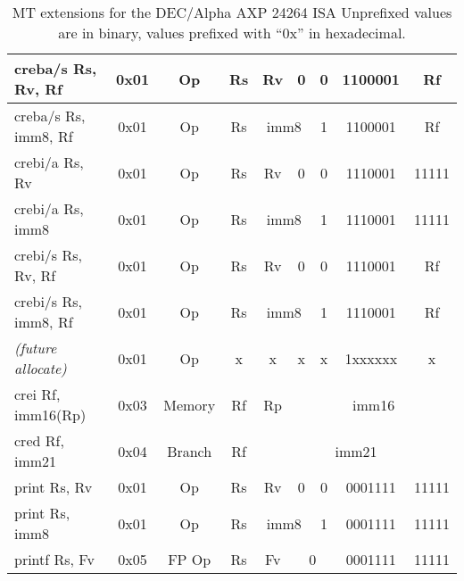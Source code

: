 \documentclass[a4paper,11pt]{article}
\begin{document}
\begin{table}
\begin{center}
{\begin{tabular}{|>{\ttfamily}l||c|c|c|c|c|c|c|c|}
creba/s Rs, Rv, Rf      & 0x01 & Op     & Rs &                    Rv & 0 & 0 & 1100001 & Rf \\ \cline{5-6}
creba/s Rs, imm8, Rf    & 0x01 & Op     & Rs & \multicolumn{2}{c|}{imm8} & 1 & 1100001 & Rf \\ \cline{5-6}
crebi/a Rs, Rv          & 0x01 & Op     & Rs &                    Rv & 0 & 0 & 1110001 & 11111 \\ \cline{5-6}
crebi/a Rs, imm8        & 0x01 & Op     & Rs & \multicolumn{2}{c|}{imm8} & 1 & 1110001 & 11111 \\ \cline{5-6}
crebi/s Rs, Rv, Rf      & 0x01 & Op     & Rs &                    Rv & 0 & 0 & 1110001 & Rf \\ \cline{5-6}
crebi/s Rs, imm8, Rf    & 0x01 & Op     & Rs & \multicolumn{2}{c|}{imm8} & 1 & 1110001 & Rf \\ \cline{5-6}
\hline \hline
\normalfont \emph{(future allocate)} & 0x01 & Op & x & x & x & x & 1xxxxxx & x \\
\hline\hline
crei  Rf, imm16(Rp)     & 0x03 & Memory & Rf & Rp & \multicolumn{4}{c|}{imm16} \\
\hline\hline
cred  Rf, imm21         & 0x04 & Branch & Rf & \multicolumn{5}{c|}{imm21} \\
\hline \hline
print Rs, Rv            & 0x01 & Op     & Rs &                    Rv & 0 & 0 & 0001111 & 11111 \\ \cline{5-6}
print Rs, imm8          & 0x01 & Op     & Rs & \multicolumn{2}{c|}{imm8} & 1 & 0001111 & 11111 \\ \cline{5-7}
printf Rs, Fv           & 0x05 & FP Op  & Rs & Fv & \multicolumn{2}{c|}{0} &  0001111  & 11111 \\ 
\hline
\end{tabular}
\caption{MT extensions for the DEC/Alpha AXP 24264 ISA \newline Unprefixed values are in binary, values prefixed with ``0x'' in hexadecimal.}
}\end{center}
\end{table}
\end{document}
